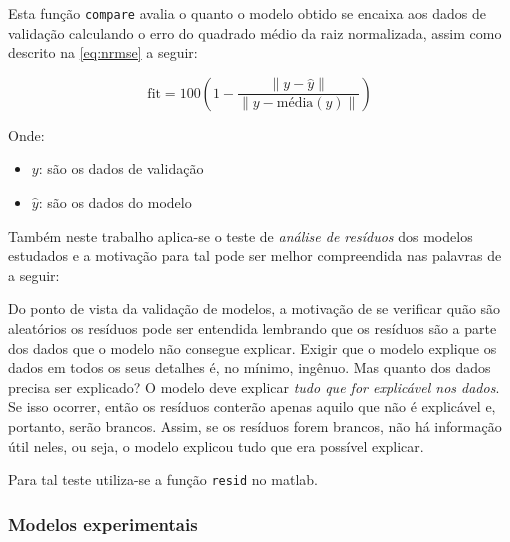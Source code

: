Esta função \texttt{compare} avalia o quanto o modelo obtido se encaixa aos dados de validação calculando
o erro do quadrado médio da raiz normalizada, assim como descrito na \cref{eq:nrmse} a seguir:

\begin{equation}
	\label{eq:nrmse}
	\mathrm{fit} = 100 \left( 1 - \frac{ \| y - \hat{y} \| }{ \| y - \mathrm{média}(y) \| } \right)
\end{equation}

\noindent
Onde: 
\begin{itemize}
	\item $y$: são os dados de validação
	\item $\hat{y}$: são os dados do modelo
\end{itemize}

Também neste trabalho aplica-se o teste de \textit{análise de resíduos} dos modelos estudados e a motivação
para tal pode ser melhor compreendida nas palavras de  a seguir:

\begin{citacao}
    \text{[...]} Do ponto de vista da validação de modelos, a motivação de se verificar quão são aleatórios
    os resíduos pode ser entendida lembrando que os resíduos são a parte dos dados que o modelo não
    consegue explicar. Exigir que o modelo explique os dados em todos os seus detalhes é, no mínimo,
    ingênuo. Mas quanto dos dados precisa ser explicado? O modelo deve explicar \textit{tudo que for
    explicável nos dados}. Se isso ocorrer, então os resíduos conterão apenas aquilo que não é explicável e,
    portanto, serão brancos. Assim, se os resíduos forem brancos, não há informação útil neles, ou seja,
    o modelo explicou tudo que era possível explicar. \text{[...]} 
\end{citacao}

Para tal teste utiliza-se a função \texttt{resid} no \acrshort{matlab}.

\subsubsection{Modelos experimentais}
\label{subsubsec:modelo_experimental}

